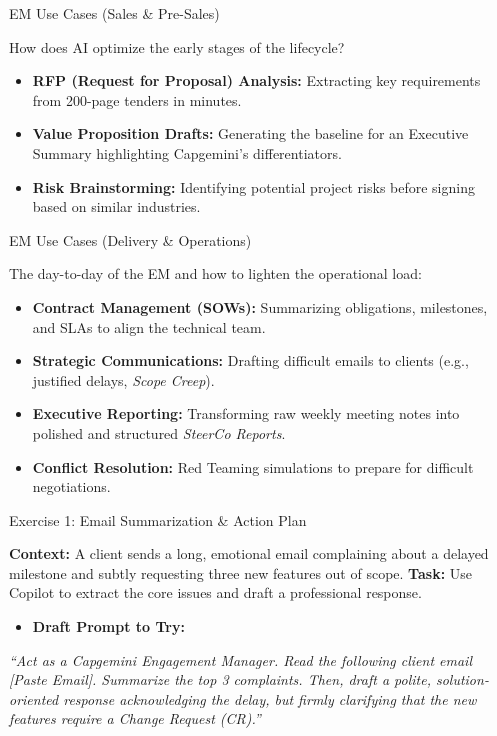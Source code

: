 \documentclass[aspectratio=169]{beamer}
\begin{document}
\begin{frame}[fragile]{EM Use Cases (Sales \& Pre-Sales)}


How does AI optimize the early stages of the lifecycle?

\begin{itemize}
  \item \textbf{RFP (Request for Proposal) Analysis:} Extracting key requirements from 200-page tenders in minutes.
  \item \textbf{Value Proposition Drafts:} Generating the baseline for an Executive Summary highlighting Capgemini's differentiators.
  \item \textbf{Risk Brainstorming:} Identifying potential project risks before signing based on similar industries.
\end{itemize}
\end{frame}



\begin{frame}[fragile]{EM Use Cases (Delivery \& Operations)}


The day-to-day of the EM and how to lighten the operational load:

\begin{itemize}
  \item \textbf{Contract Management (SOWs):} Summarizing obligations, milestones, and SLAs to align the technical team.
  \item \textbf{Strategic Communications:} Drafting difficult emails to clients (e.g., justified delays, \textit{Scope Creep}).
  \item \textbf{Executive Reporting:} Transforming raw weekly meeting notes into polished and structured \textit{SteerCo Reports}.
  \item \textbf{Conflict Resolution:} Red Teaming simulations to prepare for difficult negotiations.
\end{itemize}
\end{frame}



\begin{frame}[fragile]{Exercise 1: Email Summarization \& Action Plan}


\textbf{Context:} A client sends a long, emotional email complaining about a delayed milestone and subtly requesting three new features out of scope.
\textbf{Task:} Use Copilot to extract the core issues and draft a professional response.

\begin{itemize}
  \item \textbf{Draft Prompt to Try:}
\end{itemize}
\textit{``Act as a Capgemini Engagement Manager. Read the following client email [Paste Email]. Summarize the top 3 complaints. Then, draft a polite, solution-oriented response acknowledging the delay, but firmly clarifying that the new features require a Change Request (CR).''}

\end{frame}
\end{document}
